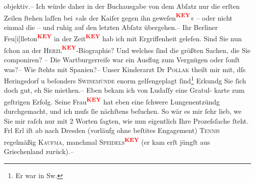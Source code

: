 {\begin{ledgroupsized}[t]{13cm}
               objektiv.– Ich würde daher in der Buchausgabe von dem Abſatz nur die erſten Zeilen
               ſtehen laſſen bei »als der Kaiſer gegen ihn
                  geweſen\textcolor{red}{\textsuperscript{\textbf{KEY}}}« – oder nicht einmal die – und ruhig auf den letzten Abſatz
               übergehen.– \pend
           \pstart
           Ihr Berliner Feu{[}i{]}lleton\textcolor{red}{\textsuperscript{\textbf{KEY}}} in der Zeit\textcolor{red}{\textsuperscript{\textbf{KEY}}} hab ich mit Ergriffenheit geleſen. Sind {\pb}Sie nun ſchon an der \textsc{Herzl\textcolor{red}{\textsuperscript{\textbf{KEY}}}}-Biographie? Und welches ſind die größten Sachen, die Sie componiren? – Die Wartburgerreiſe war ein Ausflug zum Vergnügen
               oder ſonſt was?– Wie ſtehts mit Spanien?– Unser
               Kinderarzt Dr \textsc{Pollak} theilt mir mit, dſs Heringsdorf u
               beſonders \textsc{Swinemünde} enorm gelſengeplagt ſind\footnote{\noindent{}Er war in Sw.} Erkundg Sie ſich doch gut, eh Sie miethen.– Eben bekam ich von Ludaſſy eine Gratul- karte zum geſtrigen
               Erfolg. Seine Frau\textcolor{red}{\textsuperscript{\textbf{KEY}}} hat eben eine
               ſchwere Lungenentzündg durchgemacht, und ich muſs ſie nächſtens beſuchen. So wär es
               mir ſehr lieb, {\pb}we{\geminationn} Sie mir raſch nur mit 2 Worten  ſagten, wie nun eigentlich Ihre Prozeſsſache ſteht. \pend
           \pstart
           Frl Erl iſt ab nach Dresden (vorläufg ohne beſti{\geminationm}tes
               Engagement) \textsc{Tennis} regelmäßig \textsc{Kaufma{\geminationn}}, manchmal \textsc{Speidels\textcolor{red}{\textsuperscript{\textbf{KEY}}}} (er kam erſt jüngſt aus Griechenland
               zurück).– \pend

\end{ledgroupsized}}
